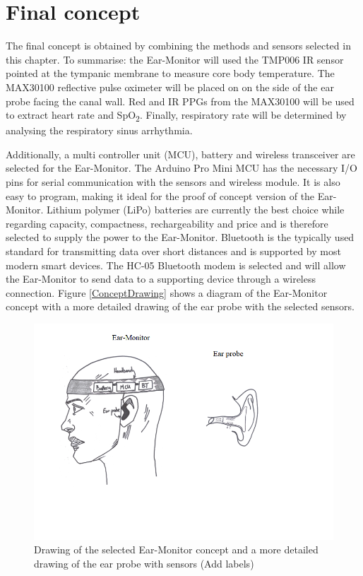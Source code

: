 \section{Final concept}
The final concept is obtained by combining the methods and sensors selected in this chapter. To summarise: the Ear-Monitor will used the TMP006 IR sensor pointed at the tympanic membrane to measure core body temperature. The MAX30100 reflective pulse oximeter will be placed on on the side of the ear probe facing the canal wall. Red and IR PPGs from the MAX30100 will be used to extract heart rate and SpO\textsubscript{2}. Finally, respiratory rate will be determined by analysing the respiratory sinus arrhythmia.

\medskip

Additionally, a multi controller unit (MCU), battery and wireless transceiver are selected for the Ear-Monitor. The Arduino Pro Mini MCU has the necessary I/O pins for serial communication with the sensors and wireless module. It is also easy to program, making it ideal for the proof of concept version of the Ear-Monitor. Lithium polymer (LiPo) batteries are currently the best choice while regarding capacity, compactness, rechargeability and price and is therefore selected to supply the power to the Ear-Monitor. Bluetooth is the typically used standard for transmitting data over short distances and is supported by most modern smart devices. The HC-05 Bluetooth modem is selected and will allow the Ear-Monitor to send data to a supporting device through a wireless connection. Figure \ref{ConceptDrawing} shows a diagram of the Ear-Monitor concept with a more detailed drawing of the ear probe with the selected sensors.

\begin{figure}[H]
   \centering
   \includegraphics[scale=1]{figs/ConceptDrawing.png}
   \caption{Drawing of the selected Ear-Monitor concept and a more detailed drawing of the ear probe with sensors (Add labels)}
   \label{fig:ConceptDrawing}
\end{figure}
